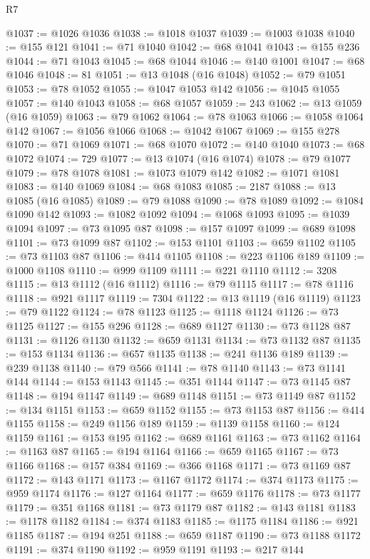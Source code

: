\begin{lexlean}{R7}
\begin{coremodule}
@1037 := @1026 @1036
@1038 := @1018 @1037
@1039 := @1003 @1038
@1040 := @155 @121
@1041 := @71 @1040
@1042 := @68 @1041
@1043 := @155 @236
@1044 := @71 @1043
@1045 := @68 @1044
@1046 := @140 @1001
@1047 := @68 @1046
@1048 := 81
@1051 := @13 @1048 (@16 @1048)
@1052 := @79 @1051
@1053 := @78 @1052
@1055 := @1047 @1053 @142
@1056 := @1045 @1055
@1057 := @140 @1043
@1058 := @68 @1057
@1059 := 243
@1062 := @13 @1059 (@16 @1059)
@1063 := @79 @1062
@1064 := @78 @1063
@1066 := @1058 @1064 @142
@1067 := @1056 @1066
@1068 := @1042 @1067
@1069 := @155 @278
@1070 := @71 @1069
@1071 := @68 @1070
@1072 := @140 @1040
@1073 := @68 @1072
@1074 := 729
@1077 := @13 @1074 (@16 @1074)
@1078 := @79 @1077
@1079 := @78 @1078
@1081 := @1073 @1079 @142
@1082 := @1071 @1081
@1083 := @140 @1069
@1084 := @68 @1083
@1085 := 2187
@1088 := @13 @1085 (@16 @1085)
@1089 := @79 @1088
@1090 := @78 @1089
@1092 := @1084 @1090 @142
@1093 := @1082 @1092
@1094 := @1068 @1093
@1095 := @1039 @1094
@1097 := @73 @1095 @87
@1098 := @157 @1097
@1099 := @689 @1098
@1101 := @73 @1099 @87
@1102 := @153 @1101
@1103 := @659 @1102
@1105 := @73 @1103 @87
@1106 := @414 @1105
@1108 := @223 @1106 @189
@1109 := @1000 @1108
@1110 := @999 @1109
@1111 := @221 @1110
@1112 := 3208
@1115 := @13 @1112 (@16 @1112)
@1116 := @79 @1115
@1117 := @78 @1116
@1118 := @921 @1117
@1119 := 7304
@1122 := @13 @1119 (@16 @1119)
@1123 := @79 @1122
@1124 := @78 @1123
@1125 := @1118 @1124
@1126 := @73 @1125
@1127 := @155 @296
@1128 := @689 @1127
@1130 := @73 @1128 @87
@1131 := @1126 @1130
@1132 := @659 @1131
@1134 := @73 @1132 @87
@1135 := @153 @1134
@1136 := @657 @1135
@1138 := @241 @1136 @189
@1139 := @239 @1138
@1140 := @79 @566
@1141 := @78 @1140
@1143 := @73 @1141 @144
@1144 := @153 @1143
@1145 := @351 @1144
@1147 := @73 @1145 @87
@1148 := @194 @1147
@1149 := @689 @1148
@1151 := @73 @1149 @87
@1152 := @134 @1151
@1153 := @659 @1152
@1155 := @73 @1153 @87
@1156 := @414 @1155
@1158 := @249 @1156 @189
@1159 := @1139 @1158
@1160 := @124 @1159
@1161 := @153 @195
@1162 := @689 @1161
@1163 := @73 @1162
@1164 := @1163 @87
@1165 := @194 @1164
@1166 := @659 @1165
@1167 := @73 @1166
@1168 := @157 @384
@1169 := @366 @1168
@1171 := @73 @1169 @87
@1172 := @143 @1171
@1173 := @1167 @1172
@1174 := @374 @1173
@1175 := @959 @1174
@1176 := @127 @1164
@1177 := @659 @1176
@1178 := @73 @1177
@1179 := @351 @1168
@1181 := @73 @1179 @87
@1182 := @143 @1181
@1183 := @1178 @1182
@1184 := @374 @1183
@1185 := @1175 @1184
@1186 := @921 @1185
@1187 := @194 @251
@1188 := @659 @1187
@1190 := @73 @1188 @1172
@1191 := @374 @1190
@1192 := @959 @1191
@1193 := @217 @144

\end{coremodule}
\end{lexlean}
